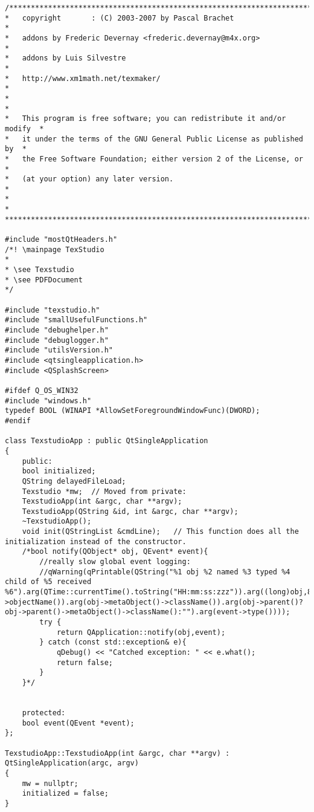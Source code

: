 \begin{lstlisting}[style=cstyle]
/***************************************************************************
*   copyright       : (C) 2003-2007 by Pascal Brachet                     *
*   addons by Frederic Devernay <frederic.devernay@m4x.org>               *
*   addons by Luis Silvestre                                              *
*   http://www.xm1math.net/texmaker/                                      *
*                                                                         *
*   This program is free software; you can redistribute it and/or modify  *
*   it under the terms of the GNU General Public License as published by  *
*   the Free Software Foundation; either version 2 of the License, or     *
*   (at your option) any later version.                                   *
*                                                                         *
***************************************************************************/

#include "mostQtHeaders.h"
/*! \mainpage TexStudio
*
* \see Texstudio
* \see PDFDocument
*/

#include "texstudio.h"
#include "smallUsefulFunctions.h"
#include "debughelper.h"
#include "debuglogger.h"
#include "utilsVersion.h"
#include <qtsingleapplication.h>
#include <QSplashScreen>

#ifdef Q_OS_WIN32
#include "windows.h"
typedef BOOL (WINAPI *AllowSetForegroundWindowFunc)(DWORD);
#endif

class TexstudioApp : public QtSingleApplication
{
	public:
	bool initialized;
	QString delayedFileLoad;
	Texstudio *mw;  // Moved from private:
	TexstudioApp(int &argc, char **argv);
	TexstudioApp(QString &id, int &argc, char **argv);
	~TexstudioApp();
	void init(QStringList &cmdLine);   // This function does all the initialization instead of the constructor.
	/*bool notify(QObject* obj, QEvent* event){
		//really slow global event logging:
		//qWarning(qPrintable(QString("%1 obj %2 named %3 typed %4 child of %5 received %6").arg(QTime::currentTime().toString("HH:mm:ss:zzz")).arg((long)obj,8,16).arg(obj->objectName()).arg(obj->metaObject()->className()).arg(obj->parent()?obj->parent()->metaObject()->className():"").arg(event->type())));
		try {
			return QApplication::notify(obj,event);
		} catch (const std::exception& e){
			qDebug() << "Catched exception: " << e.what();
			return false;
		}
	}*/
	
	
	protected:
	bool event(QEvent *event);
};

TexstudioApp::TexstudioApp(int &argc, char **argv) : QtSingleApplication(argc, argv)
{
	mw = nullptr;
	initialized = false;
}


\end{lstlisting}
